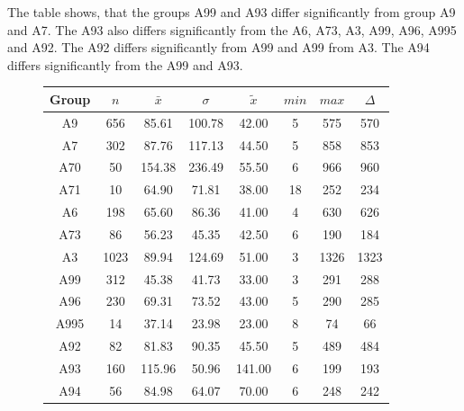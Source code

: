 The table shows, that the groups A99 and A93 differ significantly from group A9 and A7. The A93 also differs significantly from the A6, A73, A3, A99, A96, A995 and A92. The A92 differs significantly from A99 and A99 from A3. The A94 differs significantly from the A99 and A93.
\begin{figure}[ht!]
	\centering
	\begin{minipage}{0.5\textwidth}
		\tiny
		\setlength{\tabcolsep}{4pt}
		\centering
		\begin{tabular}{c|c|c|c|c|c|c|c}
			\toprule
			Group & $n$ & $\bar{x}$ & $\sigma$ & $\tilde{x}$ & $min$ & $max$ & $\Delta$ \\
			\midrule
			A9   & 656  & 85.61  & 100.78 & 42.00  & 5  & 575  & 570 \\ 
			A7   & 302  & 87.76  & 117.13 & 44.50  & 5  & 858  & 853 \\ 
			A70  & 50   & 154.38 & 236.49 & 55.50  & 6  & 966  & 960 \\ 
			A71  & 10   & 64.90  & 71.81  & 38.00  & 18 & 252  & 234 \\ 
			A6   & 198  & 65.60  & 86.36  & 41.00  & 4  & 630  & 626 \\ 
			A73  & 86   & 56.23  & 45.35  & 42.50  & 6  & 190  & 184 \\ 
			A3   & 1023 & 89.94  & 124.69 & 51.00  & 3  & 1326 & 1323 \\ 
			A99  & 312  & 45.38  & 41.73  & 33.00  & 3  & 291  & 288 \\ 
			A96  & 230  & 69.31  & 73.52  & 43.00  & 5  & 290  & 285 \\ 
			A995 & 14   & 37.14  & 23.98  & 23.00  & 8  & 74   & 66 \\ 
			A92  & 82   & 81.83  & 90.35  & 45.50  & 5  & 489  & 484 \\ 
			A93  & 160  & 115.96 & 50.96  & 141.00 & 6  & 199  & 193 \\ 
			A94  & 56   & 84.98  & 64.07  & 70.00  & 6  & 248  & 242 \\ 
			\bottomrule
		\end{tabular}
		\label{tbl:descriptives_arbis_matched_Strasse_TAvg}
	\end{minipage}%
	\begin{minipage}{0.55\textwidth}
\end{minipage}
\end{figure}
